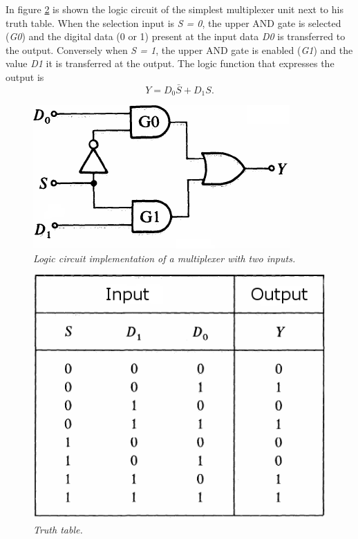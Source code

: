 In figure \ref{mux_funz} is shown the logic circuit of the simplest multiplexer unit next to his truth table. When the selection input is \textit{S = 0}, the upper AND gate is selected (\textit{G0}) and the digital data (0 or 1) present at the input data \textit{D0} is transferred to the output. Conversely when \textit{S = 1}, the upper AND gate is enabled (\textit{G1}) and the value \textit{D1} it is transferred at the output. The logic function that expresses the output is
\begin{equation}
Y=D_0\bar S+D_1S.
\label{eq1}
\end{equation}
\begin{figure}[!h]
	\centering
	\includegraphics[scale=0.6]{immagini/mux_1.png}
	\caption{\textit{Logic circuit implementation of a multiplexer with two inputs.}} 
	\label{mux_1}
\end{figure}

\begin{figure}[!h]
	\centering
	\includegraphics[scale=0.4]{immagini/mux_fun1.png}
	\caption{\textit{Truth table.}} 
	\label{mux_funz}
\end{figure}
\newpage
